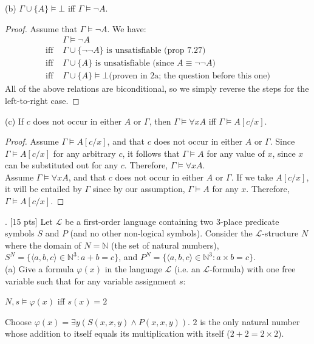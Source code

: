 \documentclass[11pt]{article}
\begin{document}
\newpage
\noindent
(b) $\Gamma \cup \{A\} \models \bot$ iff $\Gamma \models \neg A$.
\color{RoyalBlue}
\begin{proof}
Assume that $\Gamma \models \neg A$. We have:
\begin{align*}
    & \Gamma \models \neg A \\
    \text{iff } & \Gamma \cup \{\neg\neg A\} \text{ is unsatisfiable (prop 7.27)} \\
    \text{iff } & \Gamma \cup \{A\} \text{ is unsatisfiable (since $A \equiv \neg\neg A$)} \\
    \text{iff } & \Gamma \cup \{A\} \models \bot \text{(proven in 2a; the question before this one)}
\end{align*}
All of the above relations are biconditional, so we simply reverse the steps for the left-to-right case.
\end{proof}
\color{black}

\noindent
(c) If $c$ does not occur in either $A$ or $\Gamma$, then $\Gamma \models \forall x A$ iff $\Gamma \models A[c/x]$.
\color{RoyalBlue}
\begin{proof}
Assume $\Gamma \models A[c/x]$, and that $c$ does not occur in either $A$ or $\Gamma$. Since $\Gamma \models A[c/x]$ for any arbitrary $c$, it follows that $\Gamma \models A$ for any value of $x$, since $x$ can be substituted out for any $c$. Therefore, $\Gamma \models \forall x A$. \\

\noindent
Assume $\Gamma \models \forall x A$, and that $c$ does not occur in either $A$ or $\Gamma$. If we take $A[c/x]$, it will be entailed by $\Gamma$ since by our assumption, $\Gamma \models A$ for any $x$. Therefore, $\Gamma \models A[c/x]$.
\end{proof}
\color{black}

. [15 pts] Let $\mathcal{L}$ be a first-order language containing two 3-place predicate symbols $S$ and $P$ (and no other non-logical symbols). Consider the $\mathcal{L}$-structure $N$ where the domain of $N = \mathbb{N}$ (the set of natural numbers), $S^N = \{\langle a,b,c\rangle \in \mathbb{N}^3: a+b=c\}$, and $P^N = \{\langle a,b,c\rangle \in \mathbb{N}^3: a \times b = c\}$. \\

\noindent
(a) Give a formula $\varphi(x)$ in the language $\mathcal{L}$ (i.e. an $\mathcal{L}$-formula) with one free variable such that for any variable assignment $s$:
\begin{center}
$N,s \models \varphi(x)$ iff $s(x)=2$
\end{center}
\color{RoyalBlue}
Choose $\varphi(x) = \exists y(S(x, x, y) \wedge P(x, x, y))$. $2$ is the only natural number whose addition to itself equals its multiplication with itself ($2+2=2\times2$). \\
\color{Black}
\end{document}
